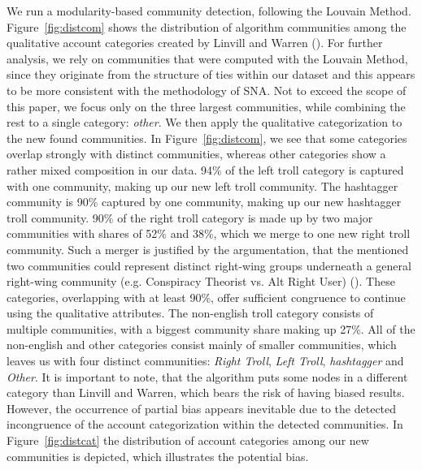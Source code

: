 \documentclass[12pt, titlepage=true, toc=bib]{scrartcl}
\begin{document}
We run a modularity-based community detection, following the Louvain Method. Figure~\ref{fig:distcom} shows the distribution of algorithm communities among the qualitative account categories created by Linvill and Warren (\cite*{linvill_troll_2018}). For further analysis, we rely on communities that were computed with the Louvain Method, since they originate from the structure of ties within our dataset and this appears to be more consistent with the methodology of SNA. Not to exceed the scope of this paper, we focus only on the three largest communities, while combining the rest to a single category: \textit{other}. We then apply the qualitative categorization to the new found communities. In Figure~\ref{fig:distcom}, we see that some categories overlap strongly with distinct communities, whereas other categories show a rather mixed composition in our data. 94\% of the left troll category is captured with one community,  making up our new left troll community. The hashtagger community is 90\% captured by one community, making up our new hashtagger troll community. 90\% of the right troll category is made up by two major communities with shares of 52\% and 38\%, which we merge to one new right troll community. Such a merger is justified by the argumentation, that the mentioned two communities could represent distinct right-wing groups underneath a general right-wing community (e.g. Conspiracy Theorist vs. Alt Right User) (\cite[cf.]{kaiser_unite_2018}). These categories, overlapping with at least 90\%, offer sufficient congruence to continue using the qualitative attributes. The non-english troll category consists of multiple communities, with a biggest community share making up 27\%. All of the non-english and other categories consist mainly of smaller communities, which leaves us with four distinct communities: \textit{Right Troll}, \textit{Left Troll}, \textit{hashtagger} and \textit{Other}. It is important to note, that the algorithm puts some nodes in a different category than Linvill and Warren, which bears the risk of having biased results. However, the occurrence of partial bias appears inevitable due to the detected incongruence of the account categorization within the detected communities. In Figure~\ref{fig:distcat} the distribution of account categories among our new communities is depicted, which illustrates the potential bias.
\end{document}
